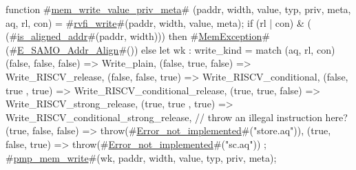 function #\hyperref[sailRISCVzmemzywritezyvaluezyprivzymeta]{mem\_write\_value\_priv\_meta}# (paddr, width, value, typ, priv, meta, aq, rl, con) = {
  #\hyperref[sailRISCVzrvfizywrite]{rvfi\_write}#(paddr, width, value, meta);
  if (rl | con) & (~ (#\hyperref[sailRISCVziszyalignedzyaddr]{is\_aligned\_addr}#(paddr, width)))
  then #\hyperref[sailRISCVzMemException]{MemException}#(#\hyperref[sailRISCVzEzySAMOzyAddrzyAlign]{E\_SAMO\_Addr\_Align}#())
  else {
    let wk : write_kind = match (aq, rl, con) {
      (false, false, false) => Write_plain,
      (false, true,  false) => Write_RISCV_release,
      (false, false, true)  => Write_RISCV_conditional,
      (false, true , true)  => Write_RISCV_conditional_release,
      (true,  true,  false) => Write_RISCV_strong_release,
      (true,  true , true)  => Write_RISCV_conditional_strong_release,
      // throw an illegal instruction here?
      (true,  false, false) => throw(#\hyperref[sailRISCVzErrorzynotzyimplemented]{Error\_not\_implemented}#("store.aq")),
      (true,  false, true)  => throw(#\hyperref[sailRISCVzErrorzynotzyimplemented]{Error\_not\_implemented}#("sc.aq"))
    };
    #\hyperref[sailRISCVzpmpzymemzywrite]{pmp\_mem\_write}#(wk, paddr, width, value, typ, priv, meta);
  }
}
